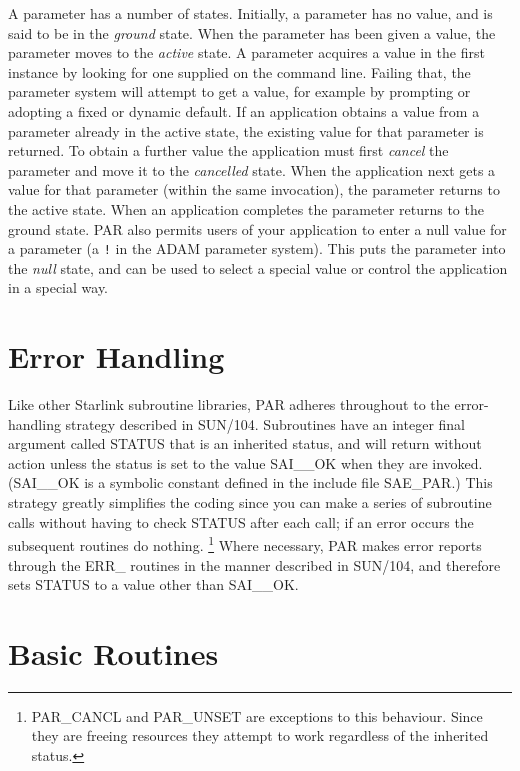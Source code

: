 \documentclass[twoside,11pt]{article}
\newcommand{\xref}[3]{#1}
\newcommand{\xlabel}[1]{}
\begin{document}
A parameter has a number of states.  Initially, a parameter has no
value, and is said to be in the {\em ground\/} state.  When the
parameter has been given a value, the parameter moves to the {\em
active\/} state.  A parameter acquires a value in the first instance by
looking for one supplied on the command line.  Failing that, the
parameter system will attempt to get a value, for example by prompting
or adopting a fixed or dynamic default.  If an application obtains a
value from a parameter already in the active state, the existing value
for that parameter is returned.  To obtain a further value the
application must first {\em cancel\/} the parameter and move it to the
{\em cancelled\/} state.  When the application next gets a value for
that parameter (within the same invocation), the parameter returns to
the active state.  When an application completes the parameter returns
to the ground state. PAR also permits users of your application to enter
a null value for a parameter (a {\tt !} in the {\footnotesize ADAM}
parameter system).  This puts the parameter into the {\em null\/} state,
and can be used to select a special value or control the application in
a special way. 

\section{\xlabel{error_handling}Error Handling}
\label{se:error}

Like other Starlink subroutine libraries, PAR adheres throughout to the
error-handling strategy described in 
\xref{SUN/104}{sun104}{}.  
Subroutines have an
integer final argument called STATUS that is an inherited status, and
will return without action unless the status is set to the value
SAI\_\_OK when they are invoked.  (SAI\_\_OK is a symbolic constant
defined in the include file SAE\_PAR.)  This strategy greatly simplifies
the coding since you can make a series of subroutine calls without
having to check STATUS after each call; if an error occurs the
subsequent routines do nothing. \footnote{PAR\_CANCL and PAR\_UNSET are
exceptions to this behaviour.  Since they are freeing resources they
attempt to work regardless of the inherited status.}  Where necessary,
PAR makes error reports through the ERR\_ routines in the manner
described in 
\xref{SUN/104}{sun104}{}, and therefore sets STATUS to a value other than
SAI\_\_OK. 


\section{\xlabel{basic_routines}Basic Routines}
\end{document}

